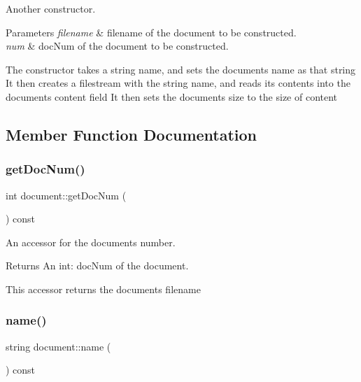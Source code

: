 Another constructor. 


\begin{DoxyParams}{Parameters}
{\em filename} & filename of the document to be constructed. \\
\hline
{\em num} & doc\+Num of the document to be constructed.\\
\hline
\end{DoxyParams}
The constructor takes a string name, and sets the document\textquotesingle{}s name as that string It then creates a filestream with the string name, and reads its contents into the document\textquotesingle{}s content field It then sets the document\textquotesingle{}s size to the size of content 

\subsection{Member Function Documentation}
\mbox{\label{classdocument_ac8755191462341296e2be04db6f8f4e5}} 
\subsubsection{\texorpdfstring{get\+Doc\+Num()}{getDocNum()}}
{\footnotesize\ttfamily int document\+::get\+Doc\+Num (\begin{DoxyParamCaption}{ }\end{DoxyParamCaption}) const}



An accessor for the document\textquotesingle{}s number. 

\begin{DoxyReturn}{Returns}
An int\+: doc\+Num of the document.
\end{DoxyReturn}
This accessor returns the document\textquotesingle{}s filename \mbox{\label{classdocument_a19e6fd5bb89537dc566df2eac658e5a6}} 
\subsubsection{\texorpdfstring{name()}{name()}}
{\footnotesize\ttfamily string document\+::name (\begin{DoxyParamCaption}{ }\end{DoxyParamCaption}) const}



